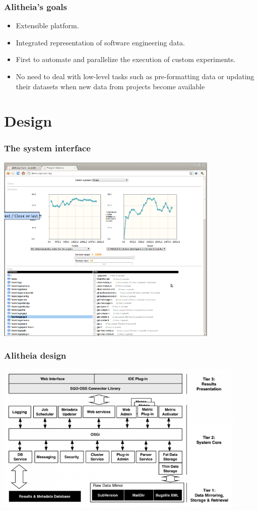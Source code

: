 \documentclass{beamer}
\begin{document}
\begin{frame}
\frametitle{Alitheia's goals}
\begin{center}
\begin{itemize}
\item Extensible platform.
\item Integrated representation of software engineering data.
\item First to automate and parallelize the execution of custom experiments.
\item No need to deal with low-level tasks such as pre-formatting data or updating 
their datasets when new data from projects become available

\end{itemize}
\end{center}
\end{frame}

\section{Design}

\begin{frame}
\frametitle{The system interface}
\begin{center}
\includegraphics[width=0.8\textwidth]{figs/alitheia-snapshot.png}
\end{center}
\end{frame}

\begin{frame}
\frametitle{Alitheia design}
\begin{center}
\includegraphics[width=0.9\textwidth]{figs/alitheia-design.png}
\end{center}
\end{frame}
\end{document}
